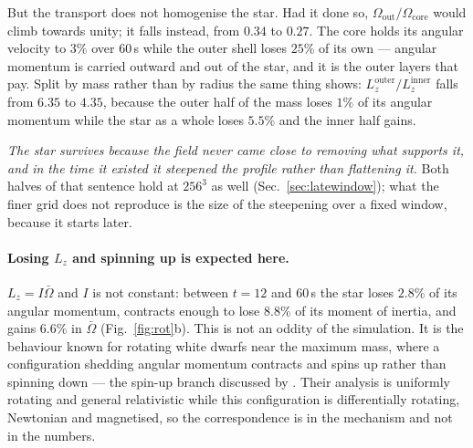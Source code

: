 \documentclass[11pt,a4paper]{article}
\begin{document}
But the transport does not homogenise the star. Had it done so,
$\Omega_{\mathrm{out}}/\Omega_{\mathrm{core}}$ would climb towards unity; it
falls instead, from $0.34$ to $0.27$. The core holds its angular velocity to
$3\%$ over $60$\,s while the outer shell loses $25\%$ of its own --- angular
momentum is carried outward and out of the star, and it is the outer layers
that pay. Split by mass rather than by radius the same thing shows:
$L_z^{\mathrm{outer}}/L_z^{\mathrm{inner}}$ falls from $6.35$ to $4.35$,
because the outer half of the mass loses $1\%$ of its angular momentum while
the star as a whole loses $5.5\%$ and the inner half gains.

\emph{The star survives because the field never came close to removing what
supports it, and in the time it existed it steepened the profile rather than
flattening it.} Both halves of that sentence hold at $256^3$ as well
(Sec.~\ref{sec:latewindow}); what the finer grid does not reproduce is the
size of the steepening over a fixed window, because it starts later.

\paragraph{Losing $L_z$ and spinning up is expected here.} $L_z = I\bar\Omega$
and $I$ is not constant: between $t = 12$ and $60$\,s the star loses $2.8\%$ of
its angular momentum, contracts enough to lose $8.8\%$ of its moment of
inertia, and gains $6.6\%$ in $\bar\Omega$ (Fig.~\ref{fig:rot}b). This is not
an oddity of the simulation. It is the behaviour known for rotating white
dwarfs near the maximum mass, where a configuration shedding angular momentum
contracts and spins up rather than spinning down --- the spin-up branch
discussed by \citet{boshkayev2013}. Their analysis is uniformly rotating and
general relativistic while this configuration is differentially rotating,
Newtonian and magnetised, so the correspondence is in the mechanism and not in
the numbers.
\end{document}
